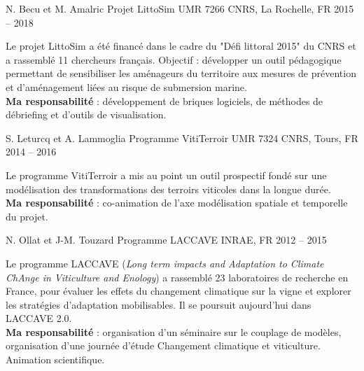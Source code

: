 \begin{cventries}
  \cventry
  {N. Becu et M. Amalric} %
  {Projet LittoSim} %
  {UMR 7266 CNRS, La Rochelle, FR} %
  {2015 -- 2018} %
  {
    \begin{cvitems} %
      Le projet LittoSim a été financé dans le cadre du "Défi littoral 2015" du CNRS et a rassemblé 11 chercheurs français. Objectif : développer un outil pédagogique permettant de sensibiliser les aménageurs du territoire aux mesures de prévention et d'aménagement liées au risque de submersion marine.\\
      \textbf{Ma responsabilité} : développement de briques logiciels, de méthodes de débriefing et d’outils de visualisation.
    \end{cvitems}
    }


\cventry
{S. Leturcq et A. Lammoglia} %
{Programme VitiTerroir} %
{UMR 7324 CNRS, Tours, FR} %
{2014 -- 2016} %
{
  \begin{cvitems} %
    Le programme VitiTerroir a mis au point un outil prospectif fondé sur une modélisation des transformations des terroirs viticoles dans la longue durée.\\
    \textbf{Ma responsabilité} : co-animation de l'axe modélisation spatiale et temporelle du projet.
  \end{cvitems}
}

\cventry
{N. Ollat et J-M. Touzard} %
{Programme LACCAVE} %
{INRAE, FR} %
{2012 -- 2015} %
{
  \begin{cvitems} %
  Le programme LACCAVE (\emph{Long term impacts and Adaptation to Climate ChAnge in Viticulture and Enology}) a rassemblé 23 laboratoires de recherche en France, pour évaluer les effets du changement climatique sur la vigne et explorer les stratégies d'adaptation mobilisables. Il se poursuit aujourd'hui dans LACCAVE 2.0.\\
  \textbf{Ma responsabilité} : organisation d'un séminaire sur le  couplage de modèles, organisation d'une journée d'étude Changement climatique et viticulture. Animation scientifique.
  \end{cvitems}
}


\end{cventries}
